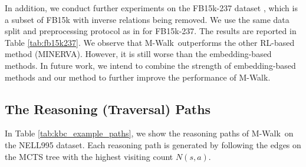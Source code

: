 \documentclass{article}
\newcommand{\modelname}{M-Walk}
\begin{document}
In addition, we conduct further experiments on the FB15k-237 dataset \cite{Kristinafb15k237}, which is a subset of FB15k \cite{bordes2013translating} with inverse relations being removed. We use the same data split and preprocessing protocol as in \cite{dettmers2018conve} for FB15k-237. The results are reported in Table \ref{tab:fb15k237}. We observe that \modelname~outperforms the other RL-based method (MINERVA). However, it is still worse than the embedding-based methods. In future work, we intend to combine the strength of embedding-based methods and our method to further improve the performance of \modelname.
	
	
	
	
\subsection{The Reasoning (Traversal) Paths}
\label{Appendix:three_glass_puzzle_paths}
In Table \ref{tab:kbc_example_paths}, we show the reasoning paths of \modelname~on the NELL995 dataset. Each reasoning path is generated by following the edges on the MCTS tree with the highest visiting count $N(s,a)$.
\end{document}
